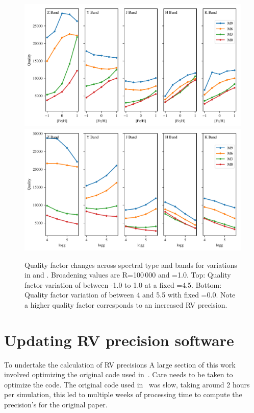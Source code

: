 {\begin{figure}
\includegraphics[width=0.99\linewidth]{figures/information-content/metalicity_effect.pdf}\\
\includegraphics[width=0.99\linewidth]{figures/information-content/logg_effect.pdf}
\caption[Quality factor verse \feh{} and \Logg{} for different spectral types and wavelength bands.]{Quality factor changes across spectral type and bands for variations in \feh{} and \Logg{}.
Broadening values are R=100\,000 and \Vsini{}=1.0\kmps{}.
Top: Quality factor variation of \feh{} between -1.0 to 1.0 at a fixed \Logg{}=4.5.
Bottom: Quality factor variation of \Logg{} between 4 and 5.5 with fixed \feh{}=0.0.
Note a higher quality factor corresponds to an increased {RV} precision.}
\label{fig:deviations}
\end{figure}


\clearpage

\section{Updating {RV} precision software}
To undertake the calculation of {RV} precisions
A large section of this work involved optimizing the original code used in~\citet{figueira_radial_2016}.
Care needs to be taken to optimize the code.
The original code used in~\citet{figueira_radial_2016} was slow, taking around 2 hours per simulation, this led to multiple weeks of processing time to compute the precision's for the original paper.

}
